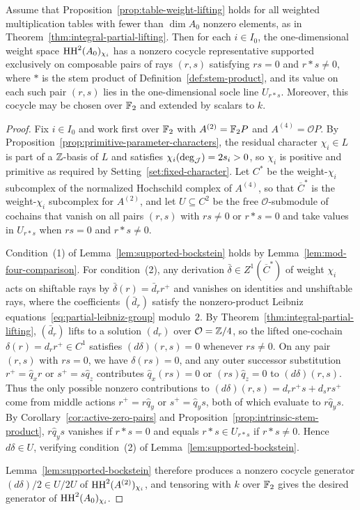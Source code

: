 \begin{corollary}
\label{cor:zero-supported-coverage}
Assume that Proposition~\ref{prop:table-weight-lifting} holds for all weighted multiplication tables with fewer than $\dim A_0$ nonzero elements, as in Theorem~\ref{thm:integral-partial-lifting}. Then for each $i\in I_0$, the one-dimensional weight space $\operatorname{HH}^2(A_0)_{\chi_i}$ has a nonzero cocycle representative supported exclusively on composable pairs of rays $(r,s)$ satisfying $rs=0$ and $r*s\ne0$, where $*$ is the stem product of Definition~\ref{def:stem-product}, and its value on each such pair $(r,s)$ lies in the one-dimensional socle line $U_{r*s}$. Moreover, this cocycle may be chosen over $\mathbb F_2$ and extended by scalars to $k$.
\end{corollary}
\begin{proof}
Fix $i\in I_0$ and work first over $\mathbb F_2$ with $A^{(2)}=\mathbb F_2P$ and $A^{(4)}=\mathcal OP$. By Proposition~\ref{prop:primitive-parameter-characters}, the residual character $\chi_i\in L$ is part of a $\mathbb Z$-basis of $L$ and satisfies $\chi_i(\deg_\mathcal J)=2s_i>0$, so $\chi_i$ is positive and primitive as required by Setting~\ref{set:fixed-character}. Let $C^*$ be the weight-$\chi_i$ subcomplex of the normalized Hochschild complex of $A^{(4)}$, so that $\overline C^*$ is the weight-$\chi_i$ subcomplex for $A^{(2)}$, and let $U\subseteq C^2$ be the free $\mathcal O$-submodule of cochains that vanish on all pairs $(r,s)$ with $rs\ne0$ or $r*s=0$ and take values in $U_{r*s}$ when $rs=0$ and $r*s\ne0$.

Condition~(1) of Lemma~\ref{lem:supported-bockstein} holds by Lemma~\ref{lem:mod-four-comparison}. For condition~(2), any derivation $\bar\delta\in Z^1(\overline C^*)$ of weight $\chi_i$ acts on shiftable rays by $\bar\delta(r)=\bar d_r r^+$ and vanishes on identities and unshiftable rays, where the coefficients $(\bar d_r)$ satisfy the nonzero-product Leibniz equations~\eqref{eq:partial-leibniz-group} modulo~$2$. By Theorem~\ref{thm:integral-partial-lifting}, $(\bar d_r)$ lifts to a solution $(d_r)$ over $\mathcal O=\mathbb Z/4$, so the lifted one-cochain $\delta(r)=d_r r^+\in C^1$ satisfies $(d\delta)(r,s)=0$ whenever $rs\ne0$. On any pair $(r,s)$ with $rs=0$, we have $\delta(rs)=0$, and any outer successor substitution $r^+=\widehat q_xr$ or $s^+=s\widehat q_z$ contributes $\widehat q_x(rs)=0$ or $(rs)\widehat q_z=0$ to $(d\delta)(r,s)$. Thus the only possible nonzero contributions to $(d\delta)(r,s)=d_r r^+s+d_s rs^+$ come from middle actions $r^+=r\widehat q_y$ or $s^+=\widehat q_ys$, both of which evaluate to $r\widehat q_ys$. By Corollary~\ref{cor:active-zero-pairs} and Proposition~\ref{prop:intrinsic-stem-product}, $r\widehat q_ys$ vanishes if $r*s=0$ and equals $r*s\in U_{r*s}$ if $r*s\ne0$. Hence $d\delta\in U$, verifying condition~(2) of Lemma~\ref{lem:supported-bockstein}.

Lemma~\ref{lem:supported-bockstein} therefore produces a nonzero cocycle generator $(d\delta)/2\in U/2U$ of $\operatorname{HH}^2(A^{(2)})_{\chi_i}$, and tensoring with $k$ over $\mathbb F_2$ gives the desired generator of $\operatorname{HH}^2(A_0)_{\chi_i}$.
\end{proof}
